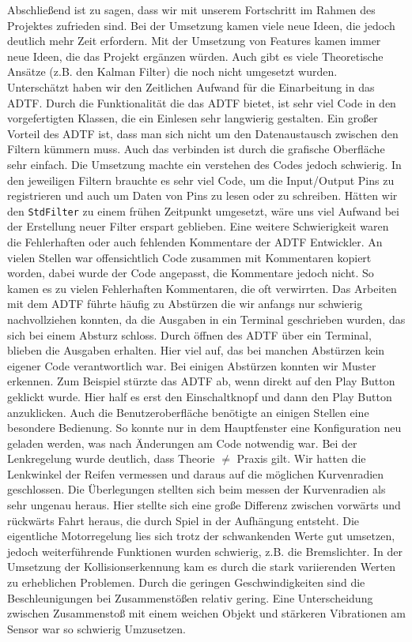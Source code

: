\documentclass[a4paper,12pt]{report}
\begin{document}
	Abschließend ist zu sagen, dass wir mit unserem Fortschritt im Rahmen des Projektes zufrieden sind. 
	Bei der Umsetzung kamen viele neue Ideen, die jedoch deutlich mehr Zeit erfordern. 
	Mit der Umsetzung von Features kamen immer neue Ideen, die das Projekt ergänzen würden. 
	Auch gibt es viele Theoretische Ansätze (z.B. den Kalman Filter) die noch nicht umgesetzt wurden. 
	\\
	Unterschätzt haben wir den Zeitlichen Aufwand für die Einarbeitung in das ADTF. 
	Durch die Funktionalität die das ADTF bietet, ist sehr viel Code in den vorgefertigten Klassen, die ein Einlesen sehr langwierig gestalten. 
	Ein großer Vorteil des ADTF ist, dass man sich nicht um den Datenaustausch zwischen den Filtern kümmern muss. 
	Auch das verbinden ist durch die grafische Oberfläche sehr einfach. 
	Die Umsetzung machte ein verstehen des Codes jedoch schwierig. 
	In den jeweiligen Filtern brauchte es sehr viel Code, um die Input/Output Pins zu registrieren und auch um Daten von Pins zu lesen oder zu schreiben. 
	Hätten wir den \texttt{StdFilter} zu einem frühen Zeitpunkt umgesetzt, wäre uns viel Aufwand bei der Erstellung neuer Filter erspart geblieben.
	Eine weitere Schwierigkeit waren die Fehlerhaften oder auch fehlenden Kommentare der ADTF Entwickler. 
	An vielen Stellen war offensichtlich Code zusammen mit Kommentaren kopiert worden, dabei wurde der Code angepasst, die Kommentare jedoch nicht.
	So kamen es zu vielen Fehlerhaften Kommentaren, die oft verwirrten. 
	Das Arbeiten mit dem ADTF führte häufig zu Abstürzen die wir anfangs nur schwierig nachvollziehen konnten, da die Ausgaben in ein Terminal geschrieben wurden, das sich bei einem Absturz schloss. 
	Durch öffnen des ADTF über ein Terminal, blieben die Ausgaben erhalten. 
	Hier viel auf, das bei manchen Abstürzen kein eigener Code verantwortlich war. 
	Bei einigen Abstürzen konnten wir Muster erkennen. 
	Zum Beispiel stürzte das ADTF ab, wenn direkt auf den Play Button geklickt wurde. 
	Hier half es erst den Einschaltknopf und dann den Play Button anzuklicken.
	Auch die Benutzeroberfläche benötigte an einigen Stellen eine besondere Bedienung. 
	So konnte nur in dem Hauptfenster eine Konfiguration neu geladen werden, was nach Änderungen am Code notwendig war.
	Bei der Lenkregelung wurde deutlich, dass Theorie $\neq$ Praxis gilt. 
	Wir hatten die Lenkwinkel der Reifen vermessen und daraus auf die möglichen Kurvenradien geschlossen.
	Die Überlegungen stellten sich beim messen der Kurvenradien als sehr ungenau heraus. 
	Hier stellte sich eine große Differenz zwischen vorwärts und rückwärts Fahrt heraus, die durch Spiel in der Aufhängung entsteht.
	Die eigentliche Motorregelung lies sich trotz der schwankenden Werte gut umsetzen, jedoch weiterführende Funktionen wurden schwierig, z.B. die Bremslichter.
	In der Umsetzung der Kollisionserkennung kam es durch die stark variierenden Werten zu erheblichen Problemen. 
	Durch die geringen Geschwindigkeiten sind die Beschleunigungen bei Zusammenstößen relativ gering. 
	Eine Unterscheidung zwischen Zusammenstoß mit einem weichen Objekt und stärkeren Vibrationen am Sensor war so schwierig Umzusetzen.
\end{document}
